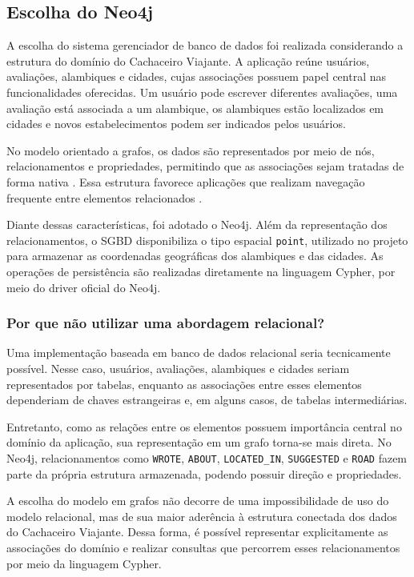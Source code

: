 \documentclass{jaes}
\begin{document}
\subsection{Escolha do Neo4j}

A escolha do sistema gerenciador de banco de dados foi realizada considerando a estrutura do domínio do Cachaceiro Viajante. A aplicação reúne usuários, avaliações, alambiques e cidades, cujas associações possuem papel central nas funcionalidades oferecidas. Um usuário pode escrever diferentes avaliações, uma avaliação está associada a um alambique, os alambiques estão localizados em cidades e novos estabelecimentos podem ser indicados pelos usuários.

No modelo orientado a grafos, os dados são representados por meio de nós, relacionamentos e propriedades, permitindo que as associações sejam tratadas de forma nativa \cite{monteiro2026grafos}. Essa estrutura favorece aplicações que realizam navegação frequente entre elementos relacionados \cite{cattell2010scalable}.

Diante dessas características, foi adotado o Neo4j. Além da representação dos relacionamentos, o SGBD disponibiliza o tipo espacial \texttt{point}, utilizado no projeto para armazenar as coordenadas geográficas dos alambiques e das cidades. As operações de persistência são realizadas diretamente na linguagem Cypher, por meio do driver oficial do Neo4j.

\subsubsection{Por que não utilizar uma abordagem relacional?}

Uma implementação baseada em banco de dados relacional seria tecnicamente possível. Nesse caso, usuários, avaliações, alambiques e cidades seriam representados por tabelas, enquanto as associações entre esses elementos dependeriam de chaves estrangeiras e, em alguns casos, de tabelas intermediárias.

Entretanto, como as relações entre os elementos possuem importância central no domínio da aplicação, sua representação em um grafo torna-se mais direta. No Neo4j, relacionamentos como \texttt{WROTE}, \texttt{ABOUT}, \texttt{LOCATED\_IN}, \texttt{SUGGESTED} e \texttt{ROAD} fazem parte da própria estrutura armazenada, podendo possuir direção e propriedades.

A escolha do modelo em grafos não decorre de uma impossibilidade de uso do modelo relacional, mas de sua maior aderência à estrutura conectada dos dados do Cachaceiro Viajante. Dessa forma, é possível representar explicitamente as associações do domínio e realizar consultas que percorrem esses relacionamentos por meio da linguagem Cypher.
\end{document}

